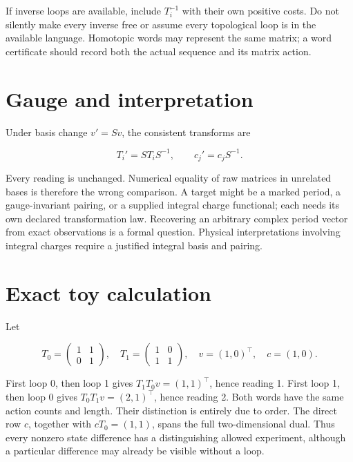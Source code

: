 \documentclass[
  11pt,
  a4paper,
]{report}
\begin{document}
If inverse loops are available, include \(T_i^{-1}\) with their own
positive costs. Do not silently make every inverse free or assume every
topological loop is in the available language. Homotopic words may
represent the same matrix; a word certificate should record both the
actual sequence and its matrix action.

\hypertarget{gauge-and-interpretation}{%
\section{Gauge and interpretation}\label{gauge-and-interpretation}}

Under basis change \(v'=Sv\), the consistent transforms are

\[
T_i'=ST_iS^{-1},\qquad c_j'=c_jS^{-1}.
\]

Every reading is unchanged. Numerical equality of raw matrices in
unrelated bases is therefore the wrong comparison. A target might be a
marked period, a gauge-invariant pairing, or a supplied integral charge
functional; each needs its own declared transformation law. Recovering
an arbitrary complex period vector from exact observations is a formal
question. Physical interpretations involving integral charges require a
justified integral basis and pairing.

\hypertarget{exact-toy-calculation}{%
\section{Exact toy calculation}\label{exact-toy-calculation}}

Let

\[
T_0=\begin{pmatrix}1&1\\0&1\end{pmatrix},\quad
T_1=\begin{pmatrix}1&0\\1&1\end{pmatrix},\quad
v=(1,0)^\top,\quad c=(1,0).
\]

First loop 0, then loop 1 gives \(T_1T_0v=(1,1)^\top\), hence reading 1.
First loop 1, then loop 0 gives \(T_0T_1v=(2,1)^\top\), hence reading 2.
Both words have the same action counts and length. Their distinction is
entirely due to order. The direct row \(c\), together with
\(cT_0=(1,1)\), spans the full two-dimensional dual. Thus every nonzero
state difference has a distinguishing allowed experiment, although a
particular difference may already be visible without a loop.
\end{document}
